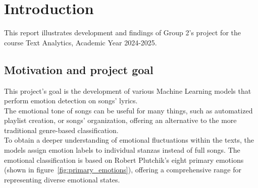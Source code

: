 \chapter*{Introduction}
\label{ch:Introduction}
This report illustrates development and findings of Group 2's project for
the course Text Analytics, Academic Year 2024-2025.



\section*{Motivation and project goal}
This project's goal is the development of various Machine Learning models that perform 
emotion detection on songs' lyrics.\\
The emotional tone of songs can be useful
for many things, such as automatized playlist creation, or songs' organization,
offering an alternative to the more traditional genre-based classification.\\
To obtain a deeper understanding of
emotional fluctuations within the texts,
the models assign emotion labels
to individual stanzas instead of full songs.
The emotional classification is based on Robert Plutchik's eight primary emotions
(shown in figure~\ref{fig:primary_emotions}),
offering a comprehensive range for representing diverse emotional states.\\
